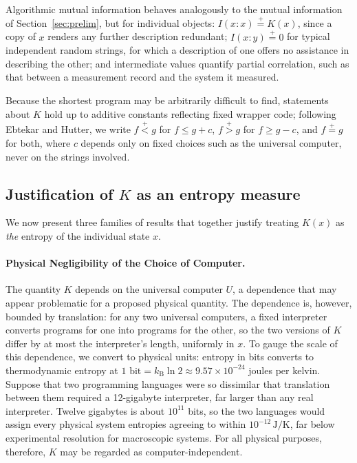 \documentclass[11pt]{article}
\newcommand{\plt}{\mathrel{\stackrel{+}{<}}}
\newcommand{\pgt}{\mathrel{\stackrel{+}{>}}}
\newcommand{\peq}{\mathrel{\stackrel{+}{=}}}
\newcommand{\kB}{k_{\mathrm{B}}}
\begin{document}
Algorithmic mutual information behaves analogously to the mutual information of Section~\ref{sec:prelim}, but for individual objects: $I(x : x) \peq K(x)$, since a copy of $x$ renders any further description redundant; $I(x : y) \peq 0$ for typical independent random strings, for which a description of one offers no assistance in describing the other; and intermediate values quantify partial correlation, such as that between a measurement record and the system it measured.

Because the shortest program may be arbitrarily difficult to find, statements about $K$ hold up to additive constants reflecting fixed wrapper code; following Ebtekar and Hutter, we write $f \plt g$ for $f \le g + c$, $f \pgt g$ for $f \ge g - c$, and $f \peq g$ for both, where $c$ depends only on fixed choices such as the universal computer, never on the strings involved.

\subsection{Justification of $K$ as an entropy measure}
\label{sec:Kjustified}

We now present three families of results that together justify treating $K(x)$ as \emph{the} entropy of the individual state $x$.

\paragraph{Physical Negligibility of the Choice of Computer.} The quantity $K$ depends on the universal computer $U$, a dependence that may appear problematic for a proposed physical quantity. The dependence is, however, bounded by translation: for any two universal computers, a fixed interpreter converts programs for one into programs for the other, so the two versions of $K$ differ by at most the interpreter's length, uniformly in $x$. To gauge the scale of this dependence, we convert to physical units: entropy in bits converts to thermodynamic entropy at $1 \text{ bit} = \kB \ln 2 \approx 9.57 \times 10^{-24}$ joules per kelvin. Suppose that two programming languages were so dissimilar that translation between them required a 12-gigabyte interpreter, far larger than any real interpreter. Twelve gigabytes is about $10^{11}$ bits, so the two languages would assign every physical system entropies agreeing to within $10^{-12}\,\mathrm{J/K}$, far below experimental resolution for macroscopic systems. For all physical purposes, therefore, $K$ may be regarded as computer-independent.
\end{document}
